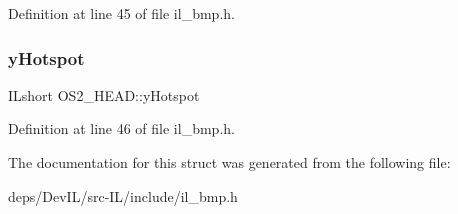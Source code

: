 Definition at line 45 of file il\+\_\+bmp.\+h.

\mbox{\label{structOS2__HEAD_a11769dfba06f1f9a40fd89b5e9b28d04}} 
\subsubsection{\texorpdfstring{y\+Hotspot}{yHotspot}}
{\footnotesize\ttfamily I\+Lshort O\+S2\+\_\+\+H\+E\+A\+D\+::y\+Hotspot}



Definition at line 46 of file il\+\_\+bmp.\+h.



The documentation for this struct was generated from the following file\+:\begin{DoxyCompactItemize}
\item 
deps/\+Dev\+I\+L/src-\/\+I\+L/include/il\+\_\+bmp.\+h\end{DoxyCompactItemize}

